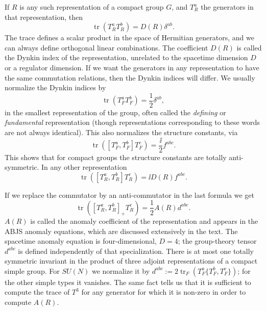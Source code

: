 If $R$ is any such representation of a compact group $G$, and $T_R^a$ the
generators in that representation, then
\begin{equation*}
  \operatorname{tr}(T_R^aT_R^b)=D(R)\delta^{ab}.
\end{equation*}
The trace defines a scalar product in the space of Hermitian generators, and
we can always define orthogonal linear combinations. The coefficient $D(R)$
is called the Dynkin index of the representation, unrelated to the spacetime
dimension $D$ or a regulator dimension. If we want the generators in any
representation to have the same commutation relations, then the Dynkin indices
will differ. We usually normalize the Dynkin indices by
\begin{equation*}
  \operatorname{tr}(T_F^aT_F^b)=\frac12\delta^{ab},
\end{equation*}
in the smallest representation of the group, often called the \emph{defining}
or \emph{fundamental} representation (though representations corresponding
to these words are not always identical). This also normalizes the structure
constants, via
\begin{equation*}
  \operatorname{tr}([T_F^a,T_F^b]T_F^c)=\frac{\ii}{2}f^{abc}.
\end{equation*}
This shows that for compact groups the structure constants are totally
anti-symmetric. In any other representation
\begin{equation*}
  \operatorname{tr}([T_R^a,T_R^b]T_R^c)=\ii D(R)f^{abc}.
\end{equation*}

If we replace the commutator by an anti-commutator in the last formula we get
\begin{equation*}
  \operatorname{tr}([T_R^a,T_R^b]_+T_R^c)=\frac12 A(R)d^{abc}.
\end{equation*}
$A(R)$ is called the anomaly coefficient of the representation and appears in
the ABJS anomaly equations, which are discussed extensively in the text. The
spacetime anomaly equation is four-dimensional, $D=4$; the group-theory tensor
$d^{abc}$ is defined independently of that specialization. There
is at most one totally symmetric invariant in the product of three adjoint
representations of a compact simple group. For $SU(N)$ we normalize it by
$d^{abc}:=2\operatorname{tr}_F(T_F^a\{T_F^b,T_F^c\})$; for the other simple
types it vanishes. The same fact tells us that it is sufficient to compute the
trace of $T^3$ for any generator for which it is non-zero in order to compute
$A(R)$.

